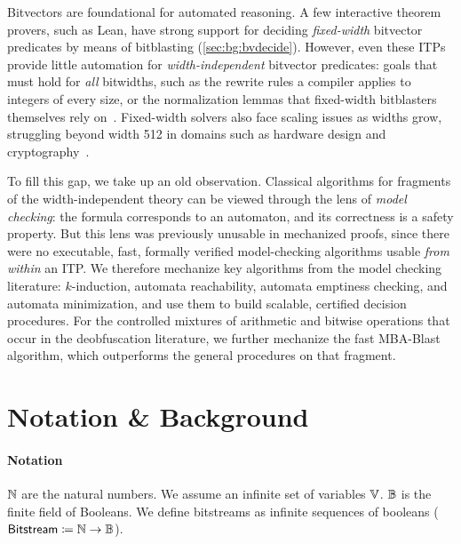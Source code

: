 Bitvectors are foundational for automated reasoning. A few
interactive theorem provers, such as Lean, have strong support for deciding
\emph{fixed-width} bitvector predicates by means of bitblasting
(\cref{sec:bg:bvdecide}). However, even these ITPs provide little automation
for \emph{width-independent} bitvector predicates: goals that must hold for
\emph{all} bitwidths, such as the rewrite rules a compiler applies to
integers of every size, or the normalization lemmas that fixed-width
bitblasters themselves rely on~\citep{niemetz2024scalable}. Fixed-width
solvers also face scaling issues as widths grow, struggling beyond width 512
in domains such as hardware design and
cryptography~\citep{lopes2018future,hydra}.

To fill this gap, we take up an old observation. Classical algorithms for
fragments of the width-independent theory can be viewed through the lens of
\emph{model checking}: the formula corresponds to an automaton, and its
correctness is a safety property. But this lens was previously unusable in
mechanized proofs, since there were no executable, fast, formally verified
model-checking algorithms usable \emph{from within} an ITP. We therefore
mechanize key algorithms from the model checking literature: $k$-induction,
automata reachability, automata emptiness checking, and automata
minimization, and use them to build scalable, certified decision procedures.
For the controlled mixtures of arithmetic and bitwise operations that occur in
the deobfuscation literature, we further mechanize the fast MBA-Blast
algorithm, which outperforms the general procedures on that fragment.

\section{Notation \& Background}
\label{sec:swbv:background}

\paragraph{Notation} $\mathbb N$ are the natural numbers. We assume an infinite set of variables $\mathbb V$.
$\mathbb B$ is the finite field of Booleans.
%
We define bitstreams as infinite sequences of booleans ($\mathsf{Bitstream} \coloneqq \mathbb N
\to \mathbb B$).

